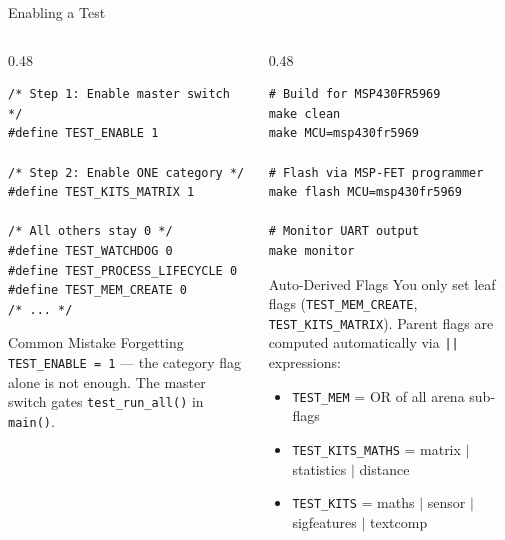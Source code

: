 \documentclass[aspectratio=169, 10pt]{beamer}
\begin{document}
\begin{frame}[fragile]{Enabling a Test}
\begin{columns}[T]
\begin{column}{0.48\textwidth}
\begin{lstlisting}[style=cstyle, title={tests/tiku\_test\_config.h}]
/* Step 1: Enable master switch */
#define TEST_ENABLE 1

/* Step 2: Enable ONE category */
#define TEST_KITS_MATRIX 1

/* All others stay 0 */
#define TEST_WATCHDOG 0
#define TEST_PROCESS_LIFECYCLE 0
#define TEST_MEM_CREATE 0
/* ... */
\end{lstlisting}

\vspace{0.3em}
\begin{alertblock}{Common Mistake}
Forgetting \texttt{TEST\_ENABLE = 1} --- the category
flag alone is not enough. The master switch gates
\texttt{test\_run\_all()} in \texttt{main()}.
\end{alertblock}
\end{column}

\begin{column}{0.48\textwidth}
\begin{lstlisting}[style=bashstyle, title={Build, flash, and monitor}]
# Build for MSP430FR5969
make clean
make MCU=msp430fr5969

# Flash via MSP-FET programmer
make flash MCU=msp430fr5969

# Monitor UART output
make monitor
\end{lstlisting}

\vspace{0.5em}
\begin{block}{Auto-Derived Flags}
You only set leaf flags (\texttt{TEST\_MEM\_CREATE},
\texttt{TEST\_KITS\_MATRIX}). Parent flags are computed
automatically via \texttt{||} expressions:
\begin{itemize}
  \item \texttt{TEST\_MEM} = OR of all arena sub-flags
  \item \texttt{TEST\_KITS\_MATHS} = matrix $|$ statistics $|$ distance
  \item \texttt{TEST\_KITS} = maths $|$ sensor $|$ sigfeatures $|$ textcomp
\end{itemize}
\end{block}
\end{column}
\end{columns}
\end{frame}
\end{document}
